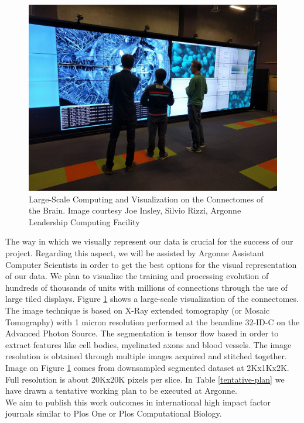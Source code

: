\documentclass[11pt,a4paper]{article}
\begin{document}
\begin{figure}[h!]
  \includegraphics[width=\linewidth]{visualization.jpg}
  \caption{Large-Scale Computing and Visualization on the Connectomes of the Brain. %
  Image courtesy Joe Insley, Silvio Rizzi, Argonne Leadership Computing Facility}
  \label{connectome}
\end{figure}

The way in which we visually represent our data is crucial for the success of
our project.
Regarding this aspect, we will be assisted by Argonne Assistant Computer Scientists
in order to get the best options for the visual representation of our data.
We plan to visualize the training and processing evolution of hundreds of thousands
of units with millions of connections through the use of large tiled displays.
Figure \ref{connectome} shows a large-scale visualization of the connectomes.
The image technique is based on X-Ray extended tomography (or Mosaic Tomography)
with 1 micron resolution performed at the beamline 32-ID-C on the Advanced Photon Source.
The segmentation is tensor flow based in order to 
extract features like cell bodies, myelinated axons and blood vessels.
The image resolution is obtained through multiple images acquired
and stitched together. Image on Figure \ref{connectome} comes from
downsampled segmented dataset at 2Kx1Kx2K.
Full resolution is about 20Kx20K pixels per slice. 
In Table \ref{tentative-plan} we have drawn a tentative working plan to be executed 
at Argonne. \\

We aim to publish this work outcomes in international high impact factor journals 
similar to Plos One or Plos Computational Biology. \\
\end{document}
